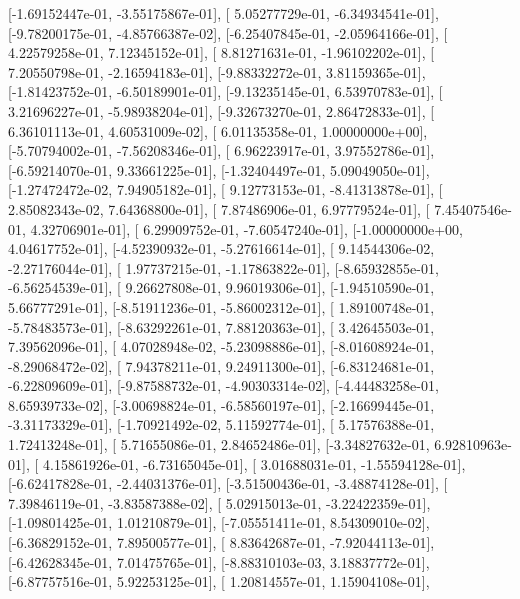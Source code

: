 \documentclass{article}
\begin{document}
       [-1.69152447e-01, -3.55175867e-01],
       [ 5.05277729e-01, -6.34934541e-01],
       [-9.78200175e-01, -4.85766387e-02],
       [-6.25407845e-01, -2.05964166e-01],
       [ 4.22579258e-01,  7.12345152e-01],
       [ 8.81271631e-01, -1.96102202e-01],
       [ 7.20550798e-01, -2.16594183e-01],
       [-9.88332272e-01,  3.81159365e-01],
       [-1.81423752e-01, -6.50189901e-01],
       [-9.13235145e-01,  6.53970783e-01],
       [ 3.21696227e-01, -5.98938204e-01],
       [-9.32673270e-01,  2.86472833e-01],
       [ 6.36101113e-01,  4.60531009e-02],
       [ 6.01135358e-01,  1.00000000e+00],
       [-5.70794002e-01, -7.56208346e-01],
       [ 6.96223917e-01,  3.97552786e-01],
       [-6.59214070e-01,  9.33661225e-01],
       [-1.32404497e-01,  5.09049050e-01],
       [-1.27472472e-02,  7.94905182e-01],
       [ 9.12773153e-01, -8.41313878e-01],
       [ 2.85082343e-02,  7.64368800e-01],
       [ 7.87486906e-01,  6.97779524e-01],
       [ 7.45407546e-01,  4.32706901e-01],
       [ 6.29909752e-01, -7.60547240e-01],
       [-1.00000000e+00,  4.04617752e-01],
       [-4.52390932e-01, -5.27616614e-01],
       [ 9.14544306e-02, -2.27176044e-01],
       [ 1.97737215e-01, -1.17863822e-01],
       [-8.65932855e-01, -6.56254539e-01],
       [ 9.26627808e-01,  9.96019306e-01],
       [-1.94510590e-01,  5.66777291e-01],
       [-8.51911236e-01, -5.86002312e-01],
       [ 1.89100748e-01, -5.78483573e-01],
       [-8.63292261e-01,  7.88120363e-01],
       [ 3.42645503e-01,  7.39562096e-01],
       [ 4.07028948e-02, -5.23098886e-01],
       [-8.01608924e-01, -8.29068472e-02],
       [ 7.94378211e-01,  9.24911300e-01],
       [-6.83124681e-01, -6.22809609e-01],
       [-9.87588732e-01, -4.90303314e-02],
       [-4.44483258e-01,  8.65939733e-02],
       [-3.00698824e-01, -6.58560197e-01],
       [-2.16699445e-01, -3.31173329e-01],
       [-1.70921492e-02,  5.11592774e-01],
       [ 5.17576388e-01,  1.72413248e-01],
       [ 5.71655086e-01,  2.84652486e-01],
       [-3.34827632e-01,  6.92810963e-01],
       [ 4.15861926e-01, -6.73165045e-01],
       [ 3.01688031e-01, -1.55594128e-01],
       [-6.62417828e-01, -2.44031376e-01],
       [-3.51500436e-01, -3.48874128e-01],
       [ 7.39846119e-01, -3.83587388e-02],
       [ 5.02915013e-01, -3.22422359e-01],
       [-1.09801425e-01,  1.01210879e-01],
       [-7.05551411e-01,  8.54309010e-02],
       [-6.36829152e-01,  7.89500577e-01],
       [ 8.83642687e-01, -7.92044113e-01],
       [-6.42628345e-01,  7.01475765e-01],
       [-8.88310103e-03,  3.18837772e-01],
       [-6.87757516e-01,  5.92253125e-01],
       [ 1.20814557e-01,  1.15904108e-01],
\end{document}
